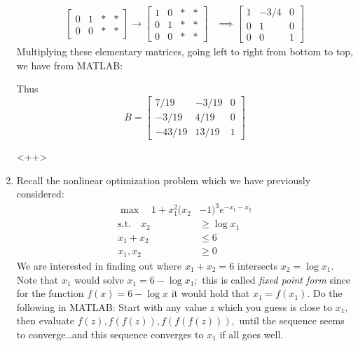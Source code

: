 \documentclass{article}
\begin{document}
\begin{enumerate}
\begin{soln}
\begin{align*}
\begin{bmatrix}
					0 & 1 & * & * \\
					0 & 0 &* & *
				\end{bmatrix} \to \begin{bmatrix}
					1 & 0 & * & * \\
					0 & 1 & * & * \\
					0 & 0 & * & *
				\end{bmatrix} &\implies \begin{bmatrix}
					1 & -3/4 & 0 \\
					0 & 1 & 0 \\
					0 & 0 & 1
				\end{bmatrix}
			\end{align*}
			Multiplying these elementary matrices, going left to right from bottom to top, we have from MATLAB:
			\lstset{language=Matlab}
			
			Thus \[B=\begin{bmatrix}
					7/19 & -3/19 & 0 \\
					-3/19 & 4/19 & 0 \\
					-43/19 & 13/19 & 1
			\end{bmatrix}\]
		\end{soln}<++>

	\item Recall the nonlinear optimization problem which we have previously considered: 
		\begin{align*}
			\max \quad 1+x_1^2(x_2&-1)^3e^{-x_1-x_2} \\
			\text{s.t.}\quad x_2&\ge\log x_1 \\
			x_1+x_2 &\le 6 \\
			x_1, x_2 &\ge 0
		\end{align*}
		We are interested in finding out where $x_1+x_2=6$ intersects $x_2=\log x_1.$ Note that $x_1$ would solve $x_1=6-\log x_1;$ this is called \textit{fixed point form} since for the function $f(x)=6-\log x$ it would hold that $x_1=f(x_1).$ Do the following in MATLAB: Start with any value $z$ which you guess is close to $x_1,$ then evaluate $f(z), f(f(z)), f(f(f(z))),$ until the sequence seems to converge\ldots and this sequence converges to $x_1$ if all goes well.


\end{enumerate}
\end{document}
